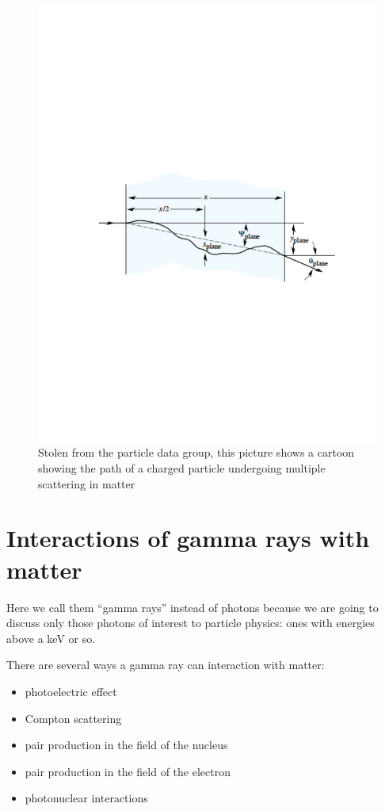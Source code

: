 \begin{figure}[h]
\centering\includegraphics[scale=0.5]{./particleinteractions/Pictures/multscattcartoon.pdf}
\caption{Stolen from the particle data group, this picture shows a cartoon showing the path of a charged particle undergoing multiple scattering in matter }
\label{fig:pdgmultscattcartoon}
\end{figure}



\section{Interactions of gamma rays with matter}

Here we call them “gamma rays” instead of photons because we are going to discuss only those photons of interest to particle physics: ones with energies above a keV or so.

There are several ways a gamma ray can interaction with matter:
\begin{itemize}
\item photoelectric effect
\item Compton scattering
\item pair production in the field of the nucleus
\item pair production in the field of the electron
\item photonuclear interactions
\end{itemize}


